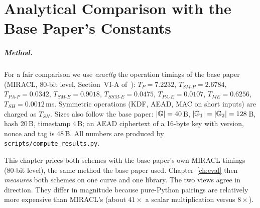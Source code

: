 \chapter{Analytical Comparison with the Base Paper's Constants}\label{sec:perf}
\paragraph{Method.} For a fair comparison we use \emph{exactly} the operation timings of the base paper (MIRACL, 80-bit level, Section~VI-A of~\cite{base}):
$T_P=7.2232$, $T_{SM\text{-}P}=2.6784$, $T_{PA\text{-}P}=0.0342$, $T_{SM\text{-}E}=0.9018$, $T_{SSM\text{-}E}=0.0475$, $T_{PA\text{-}E}=0.0107$,
$T_{ME}=0.6256$, $T_{SH}=0.0012$\,ms. Symmetric operations (KDF, AEAD, MAC on short inputs) are charged as $T_{SH}$. Sizes also follow the base paper:
$|\mathbb{G}|=40$\,B, $|\mathbb{G}_1|=|\mathbb{G}_2|=128$\,B, hash 20\,B, timestamp 4\,B; an AEAD ciphertext of a 16-byte key with version, nonce and tag is 48\,B. All numbers are produced by
\texttt{scripts/compute\_results.py}.
\begin{keybox}[title={How this chapter relates to Chapter~\ref{ch:eval}}]
This chapter prices both schemes with the base paper's own MIRACL timings (80-bit level), the same method the base paper used. Chapter~\ref{ch:eval} then
\emph{measures} both schemes on one curve and one library. The two views agree in direction. They differ in magnitude because pure-Python pairings are
relatively more expensive than MIRACL's (about $41\times$ a scalar multiplication versus $8\times$).
\end{keybox}

